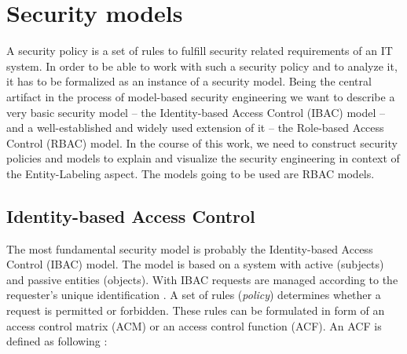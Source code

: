 \documentclass[twoside, openright, 12pt]{book}
\begin{document}
\section{Security models}
\label{security_models}
A security policy is a set of rules to fulfill security related requirements of an IT system.
In order to be able to work with such a security policy and to analyze it, it has to be formalized as an instance of a security model.
Being the central artifact in the process of model-based security engineering we want to describe a very basic security model -- the Identity-based Access Control (IBAC) model -- and a well-established and widely used extension of it -- the Role-based Access Control (RBAC) model.
In the course of this work, we need to construct security policies and models to explain and visualize the security engineering in context of the Entity-Labeling aspect.
The models going to be used are RBAC models.





\subsection{Identity-based Access Control}
\label{IBAC}
The most fundamental security model is probably the Identity-based Access Control (IBAC) model.
The model is based on a system with active (subjects) and passive entities (objects).
With IBAC requests are managed according to the requester's unique identification \citep{Lampson74}.
A set of rules (\textit{policy}) determines whether a request is permitted or forbidden.
These rules can be formulated in form of an access control matrix (ACM) or an access control function (ACF).
An ACF is defined as following \citep{Amthor18}:
\end{document}
